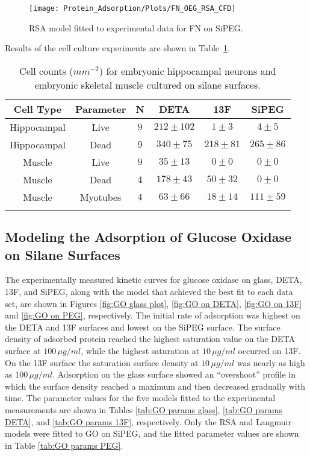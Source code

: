 %
\begin{figure}
\texttt{[image: Protein\_Adsorption/Plots/FN\_OEG\_RSA\_CFD]}

\caption{\label{fig:FN OEG fitted}RSA model fitted to experimental data for
FN on SiPEG.}
%
\end{figure}
 Results of the cell culture experiments are shown in Table~\ref{tab:Cell counts on FN}.%
\begin{table}
\caption{\label{tab:Cell counts on FN}Cell counts ($mm^{-2}$) for embryonic
hippocampal neurons and embryonic skeletal muscle cultured on silane
surfaces.}


\begin{tabular}{cccccc}
Cell Type & Parameter & N & DETA & 13F & SiPEG\tabularnewline[\doublerulesep]
\hline
\noalign{\vskip\doublerulesep}
Hippocampal & Live & $9$ & $212\pm102$ & $1\pm3$ & $4\pm5$\tabularnewline
\noalign{\vskip\doublerulesep}
Hippocampal & Dead & $9$ & $340\pm75$ & $218\pm81$ & $265\pm86$\tabularnewline
\noalign{\vskip\doublerulesep}
Muscle & Live & $9$ & $35\pm13$ & $0\pm0$ & $0\pm0$\tabularnewline
\noalign{\vskip\doublerulesep}
Muscle & Dead & $4$ & $178\pm43$ & $50\pm32$ & $0\pm0$\tabularnewline
\noalign{\vskip\doublerulesep}
Muscle & Myotubes & $4$ & $63\pm66$ & $18\pm14$ & $111\pm59$\tabularnewline
\noalign{\vskip\doublerulesep}
\end{tabular}%
\end{table}



\subsection{Modeling the Adsorption of Glucose Oxidase on Silane Surfaces}

The experimentally measured kinetic curves for glucose oxidase on
glass, DETA, 13F, and SiPEG, along with the model that achieved the
best fit to each data set, are shown in Figures \ref{fig:GO glass plot},
\ref{fig:GO on DETA}, \ref{fig:GO on 13F} and \ref{fig:GO on PEG},
respectively. The initial rate of adsorption was highest on the DETA
and 13F surfaces and lowest on the SiPEG surface. The surface density
of adsorbed protein reached the highest saturation value on the DETA
surface at $100\,\mu g/ml$, while the highest saturation at $10\,\mu g/ml$
occurred on 13F. On the 13F surface the saturation surface density
at $10\,\mu g/ml$ was nearly as high as $100\,\mu g/ml$. Adsorption
on the glass surface showed an {}``overshoot'' profile in which
the surface density reached a maximum and then decreased gradually
with time. The parameter values for the five models fitted to the
experimental measurements are shown in Tables \ref{tab:GO params glass},
\ref{tab:GO params DETA}, and \ref{tab:GO params 13F}, respectively.
Only the RSA and Langmuir models were fitted to GO on SiPEG, and the
fitted parameter values are shown in Table \ref{tab:GO params PEG}.

